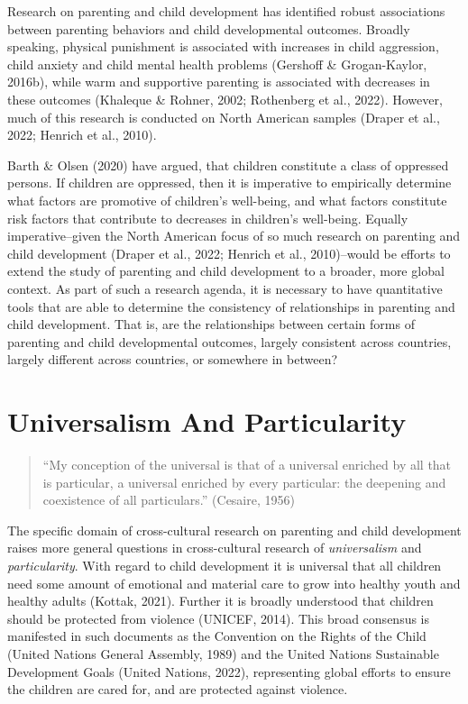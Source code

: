 \documentclass[
  letterpaper,
  DIV=11,
  numbers=noendperiod]{scrreprt}
\begin{document}
Research on parenting and child development has identified robust
associations between parenting behaviors and child developmental
outcomes. Broadly speaking, physical punishment is associated with
increases in child aggression, child anxiety and child mental health
problems (Gershoff \& Grogan-Kaylor, 2016b), while warm and supportive
parenting is associated with decreases in these outcomes (Khaleque \&
Rohner, 2002; Rothenberg et al., 2022). However, much of this research
is conducted on North American samples (Draper et al., 2022; Henrich et
al., 2010).

Barth \& Olsen (2020) have argued, that children constitute a class of
oppressed persons. If children are oppressed, then it is imperative to
empirically determine what factors are promotive of children's
well-being, and what factors constitute risk factors that contribute to
decreases in children's well-being. Equally imperative--given the North
American focus of so much research on parenting and child development
(Draper et al., 2022; Henrich et al., 2010)--would be efforts to extend
the study of parenting and child development to a broader, more global
context. As part of such a research agenda, it is necessary to have
quantitative tools that are able to determine the consistency of
relationships in parenting and child development. That is, are the
relationships between certain forms of parenting and child developmental
outcomes, largely consistent across countries, largely different across
countries, or somewhere in between?

\hypertarget{universalism-and-particularity}{%
\section{Universalism And
Particularity}\label{universalism-and-particularity}}

\begin{quote}
``My conception of the universal is that of a universal enriched by all
that is particular, a universal enriched by every particular: the
deepening and coexistence of all particulars.'' (Cesaire, 1956)
\end{quote}

The specific domain of cross-cultural research on parenting and child
development raises more general questions in cross-cultural research of
\emph{universalism} and \emph{particularity}. With regard to child
development it is universal that all children need some amount of
emotional and material care to grow into healthy youth and healthy
adults (Kottak, 2021). Further it is broadly understood that children
should be protected from violence (UNICEF, 2014). This broad consensus
is manifested in such documents as the Convention on the Rights of the
Child (United Nations General Assembly, 1989) and the United Nations
Sustainable Development Goals (United Nations, 2022), representing
global efforts to ensure the children are cared for, and are protected
against violence.
\end{document}
